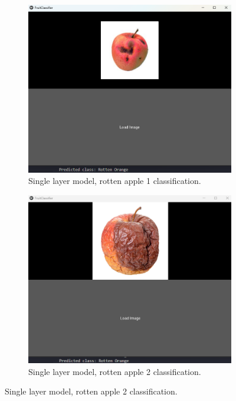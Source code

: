 \documentclass[conference]{IEEEtran}
\begin{document}
\begin{figure}[h]
    \centering
    \begin{subfigure}[b]{0.48\linewidth}
        \centering
        \includegraphics[width=\linewidth]{1layer appelR1.png}
        \caption{Single layer model, rotten apple 1 classification.}
        \label{figFA}
    \end{subfigure}
    \hfill
    \begin{subfigure}[b]{0.48\linewidth}
        \centering
        \includegraphics[width=\linewidth]{1layer appelR2.png}
        \caption{Single layer model, rotten apple 2 classification.}

\end{subfigure}
\end{figure}
\end{document}
